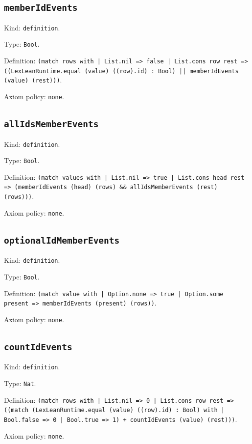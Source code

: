 \documentclass[11pt]{article}
\begin{document}
\subsection*{\texttt{memberIdEvents}}
\noindent Kind: \texttt{definition}.\par
\noindent Type: \texttt{Bool}.\par
\noindent Definition: \texttt{(match rows with | List.nil => false | List.cons row rest => ((LexLeanRuntime.equal (value) ((row).id) : Bool) || memberIdEvents (value) (rest)))}.\par
\noindent Axiom policy: \texttt{none}.\par
\subsection*{\texttt{allIdsMemberEvents}}
\noindent Kind: \texttt{definition}.\par
\noindent Type: \texttt{Bool}.\par
\noindent Definition: \texttt{(match values with | List.nil => true | List.cons head rest => (memberIdEvents (head) (rows) \&\& allIdsMemberEvents (rest) (rows)))}.\par
\noindent Axiom policy: \texttt{none}.\par
\subsection*{\texttt{optionalIdMemberEvents}}
\noindent Kind: \texttt{definition}.\par
\noindent Type: \texttt{Bool}.\par
\noindent Definition: \texttt{(match value with | Option.none => true | Option.some present => memberIdEvents (present) (rows))}.\par
\noindent Axiom policy: \texttt{none}.\par
\subsection*{\texttt{countIdEvents}}
\noindent Kind: \texttt{definition}.\par
\noindent Type: \texttt{Nat}.\par
\noindent Definition: \texttt{(match rows with | List.nil => 0 | List.cons row rest => ((match (LexLeanRuntime.equal (value) ((row).id) : Bool) with | Bool.false => 0 | Bool.true => 1) + countIdEvents (value) (rest)))}.\par
\noindent Axiom policy: \texttt{none}.\par
\end{document}
